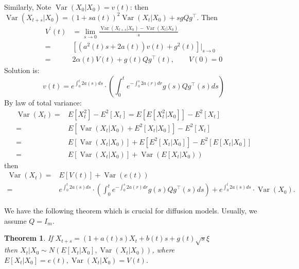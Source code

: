 \documentclass{article}
\newtheorem{theorem}{Theorem}
\begin{document}
Similarly, Note $\operatorname{Var}\left(X_{0} | X_{0}\right)=v(t)$:
then $\operatorname{Var}\left(X_{t+s} | X_{0}\right)=(1+s a(t))^{2} \operatorname{Var}\left(X_{t} | X_{0}\right)+s gQg^\top$. Then
\begin{equation}
    \begin{aligned}
        V^{\prime}(t)&=\lim _{s \rightarrow 0} \frac{\operatorname{Var}\left(X_{t+s} | X_{0}\right)-\operatorname{Var}\left(X_{t} | X_{0}\right)}{s}\\
        =&\left[\left(a^{2}(t) s+2 a(t)\right) v(t)+g^{2}(t)\right]|_{s \rightarrow 0}\\ 
        =&2 \alpha(t) V(t)+g(t)Qg^\top(t), \qquad V(0)=0
    \end{aligned}
\end{equation}
Solution is:
\begin{equation}
    v(t)=e^{\int_{0}^{t} 2a(s) d s}\cdot\left(\int_{0}^{t} e^{-\int_{0}^{s} 2 a(r) d r} g(s)Qg^\top(s) d s\right)
\end{equation} 
By law of total variance:
\begin{equation}
    \begin{aligned}
        \operatorname{Var}\left(X_{t}\right)=&E\left[X_{t}^{2}\right]-E^{2}\left[X_{t}\right]=E\left[ E\left[X_{t}^{2} | X_{0}\right]\right]-E^{2}\left[X_{t}\right] \\
        =&E\left[\operatorname{Var}\left(X_{t} | X_{0}\right)+E^{2}\left[X_{t} | X_{0}\right]\right]-E^{2}\left[X_{t}\right] \\
        =&E\left[\operatorname{Var}\left(X_{t} | X_{0}\right)\right]+E\left[E^{2}\left[X_{t} | X_0\right]\right]-E^{2}\left[E\left[X_{t} | X_{0}\right]\right]\\
        =&E\left[\operatorname{Var}\left(X_{t} | X_{0}\right)\right]+\operatorname{Var}\left(E\left[X_{t} | X_0\right)\right)
    \end{aligned}
\end{equation}
then 
\begin{equation}
    \begin{aligned}
        \operatorname{Var}(X_t)=&E[V(t)]+\operatorname{Var}(e(t))\\
        =&e^{\int_{0}^{t} 2 a(s) d s}\cdot \left(\int_{0}^{t} e^{-\int_{0}^{s} 2 a(r) d r} g(s)Qg^\top(s) d s\right) +e^{\int_{0}^{t} 2 a(s) d s} \cdot \operatorname{Var}\left(X_{0}\right) .
    \end{aligned}
\end{equation}

We have the following theorem which is crucial for diffusion models. Usually, we assume $Q=I_m$.
\begin{theorem}\label{thm1}
    If  $X_{t+s}=(1+a(t) s) X_{t}+b(t) s+g(t) \sqrt{s} \xi$\\
    then $X_{t} | X_{0} \sim N\left(E\left[X_{t} | X_{0}\right], \operatorname{Var}\left(X_{t} | X_{0}\right)\right)$, 
    where $E\left[X_{t} | X_{0}\right]=e(t), \operatorname{Var}\left(X_{t} | X_{0}\right)=V(t)$.        
\end{theorem}
\end{document}
